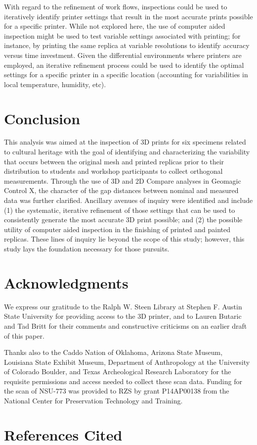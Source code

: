 \documentclass[review]{elsarticle}
\begin{document}
With regard to the refinement of work flows, inspections could be used to iteratively identify printer settings that result in the most accurate prints possible for a specific printer. While not explored here, the use of computer aided inspection might be used to test variable settings associated with printing; for instance, by printing the same replica at variable resolutions to identify accuracy versus time investment. Given the differential environments where printers are employed, an iterative refinement process could be used to identify the optimal settings for a specific printer in a specific location (accounting for variabilities in local temperature, humidity, etc). 

\section*{Conclusion}

This analysis was aimed at the inspection of 3D prints for six specimens related to cultural heritage with the goal of identifying and characterizing the variability that occurs between the original mesh and printed replicas prior to their distribution to students and workshop participants to collect orthogonal measurements. Through the use of 3D and 2D Compare analyses in Geomagic Control X, the character of the gap distances between nominal and measured data was further clarified. Ancillary avenues of inquiry were identified and include (1) the systematic, iterative refinement of those settings that can be used to consistently generate the most accurate 3D print possible; and (2) the possible utility of computer aided inspection in the finishing of printed and painted replicas. These lines of inquiry lie beyond the scope of this study; however, this study lays the foundation necessary for those pursuits.

\section*{Acknowledgments}

We express our gratitude to the Ralph W. Steen Library at Stephen F. Austin State University for providing access to the 3D printer, and to Lauren Butaric and Tad Britt for their comments and constructive criticisms on an earlier draft of this paper.

Thanks also to the Caddo Nation of Oklahoma, Arizona State Museum, Louisiana State Exhibit Museum, Department of Anthropology at the University of Colorado Boulder, and Texas Archeological Research Laboratory for the requisite permissions and access needed to collect these scan data. Funding for the scan of NSU-773 was provided to RZS by grant P14AP00138 from the National Center for Preservation Technology and Training. 

\section*{References Cited}


\end{document}
